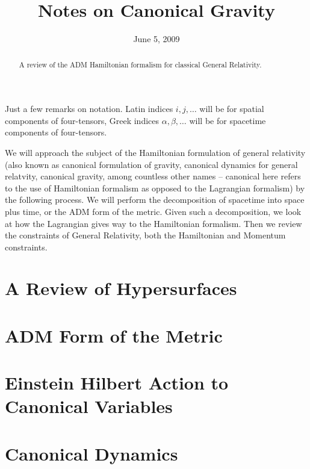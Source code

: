 \documentclass[10pt,draft]{article}
\title{Notes on Canonical Gravity}
\date{June 5, 2009}
\numberwithin{equation}{section}
\begin{document}
\maketitle
\tableofcontents
\begin{abstract}
A review of the ADM Hamiltonian formalism for classical General
Relativity.
\end{abstract}
\bigbreak
Just a few remarks on notation. Latin indices $i,j,\ldots$ will
be for spatial components of four-tensors, Greek indices
$\alpha,\beta,\ldots$ will be for spacetime components of
four-tensors.

We will approach the subject of the Hamiltonian formulation of
general relativity (also known as canonical formulation of
gravity, canonical dynamics for general relatvity, canonical
gravity, among countless other names -- canonical here refers to
the use of Hamiltonian formalism as opposed to the Lagrangian
formalism) by the following process. %
We will perform the decomposition of spacetime into space
plus time, or the ADM form of the metric. Given such a
decomposition, we look at how the Lagrangian gives way to the
Hamiltonian formalism. Then we review the constraints of General
Relativity, both the Hamiltonian and Momentum constraints.

\section{A Review of Hypersurfaces}

\section{ADM Form of the Metric}

\section{Einstein Hilbert Action to Canonical Variables}

\section{Canonical Dynamics}


\nocite{*}
\footnotesize

\end{document}
